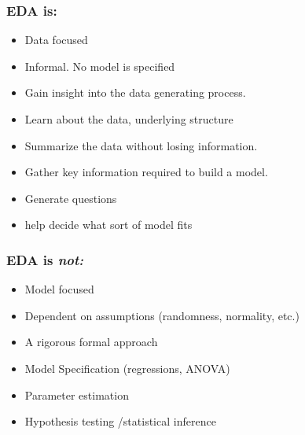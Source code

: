 \documentclass{beamer}
\begin{document}
\begin{frame}
\frametitle{EDA is:}

\begin{itemize}
\item Data focused
\item Informal. No model is specified
\item Gain insight into the data generating process. 
\item Learn about the data, underlying structure
\item Summarize the data without losing information. 
\item Gather key information required to build a model. 
\item Generate questions 
\item help decide what sort of model fits
\end{itemize}

\end{frame}



\begin{frame}
\frametitle{EDA is \em{not}:}

\begin{itemize}
\item Model focused
\item Dependent on assumptions (randomness, normality, etc.)
\item A rigorous formal approach
\item Model Specification (regressions, ANOVA)
\item Parameter estimation
\item Hypothesis testing \slash statistical inference
\end{itemize}

\end{frame}



\end{document}

